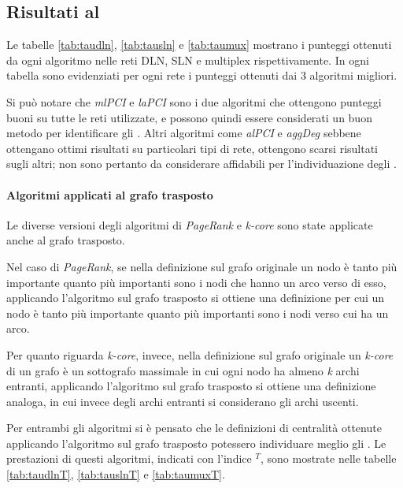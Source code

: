 \subsection{Risultati al \crepp}

Le tabelle \ref{tab:taudln}, \ref{tab:tausln} e \ref{tab:taumux} mostrano i punteggi 
ottenuti da ogni algoritmo nelle reti DLN, SLN e multiplex rispettivamente.
In ogni tabella sono evidenziati per ogni rete i punteggi ottenuti dai \num{3} algoritmi 
migliori. 

Si può notare che \textit{mlPCI} e \textit{laPCI} sono i due algoritmi che ottengono punteggi buoni 
su tutte le reti utilizzate, e possono quindi essere considerati un buon metodo per identificare 
gli \infsp. 
Altri algoritmi come \textit{alPCI} e \textit{aggDeg} sebbene ottengano ottimi risultati su
particolari tipi di rete, ottengono scarsi risultati sugli altri; non sono pertanto da 
considerare affidabili per l'individuazione degli \infsp.





\paragraph{Algoritmi applicati al grafo trasposto}
Le diverse versioni degli algoritmi di \textit{PageRank} e \textit{k-core} sono state applicate anche al grafo trasposto.

Nel caso di \textit{PageRank}, se nella definizione sul grafo originale un nodo è tanto più importante quanto 
più importanti sono i nodi che hanno un arco verso di esso, applicando l'algoritmo sul grafo trasposto si ottiene
una definizione per cui un nodo è tanto più importante quanto più importanti sono i nodi verso cui ha un arco.

Per quanto riguarda \textit{k-core}, invece, nella definizione sul grafo originale un \textit{k-core} di un grafo è un sottografo 
massimale in cui ogni nodo ha almeno \textit{k} archi entranti, applicando l'algoritmo sul grafo trasposto si ottiene 
una definizione analoga, in cui invece degli archi entranti si considerano gli archi uscenti.

Per entrambi gli algoritmi si è pensato che le definizioni di centralità ottenute applicando l'algoritmo 
sul grafo trasposto potessero individuare meglio gli \infsp. Le prestazioni di questi algoritmi, indicati 
con l'indice $^T$, sono mostrate nelle tabelle \ref{tab:taudlnT}, \ref{tab:tauslnT} e \ref{tab:taumuxT}.


